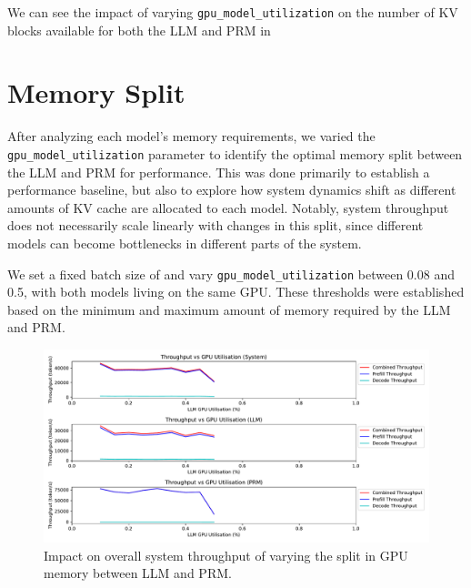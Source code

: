\documentclass[12pt,twoside]{report}
\begin{document}
We can see the impact of varying \texttt{gpu\_model\_utilization} on the number of KV blocks available for both the LLM and PRM in %

\section{Memory Split}

After analyzing each model's memory requirements, we varied the \texttt{gpu\_model\_utilization} parameter to identify the optimal memory split between the LLM and PRM for performance. 
This was done primarily to establish a performance baseline, but also to explore how system dynamics shift as different amounts of KV cache are allocated to each model. 
Notably, system throughput does not necessarily scale linearly with changes in this split, since different models can become bottlenecks in different parts of the system.

We set a fixed batch size of and vary \texttt{gpu\_model\_utilization} between 0.08 and 0.5, with both models living on the same GPU.
These thresholds were established based on the minimum and maximum amount of memory required by the LLM and PRM.

\begin{figure}[htbp]
  \centering
  \includegraphics[width=\textwidth]{figures/system_throughput_gpu_utilisation.pdf}
  \caption{Impact on overall system throughput of varying the split in GPU memory between LLM and PRM.}
  \label{fig:system_throughput_gpu_utilisation}
\end{figure}
\end{document}
